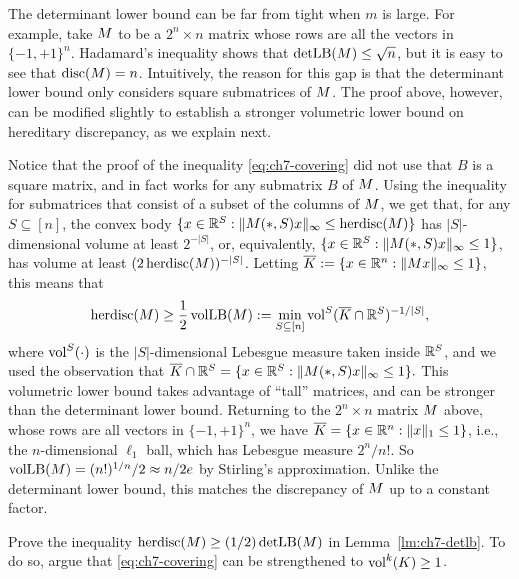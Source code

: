 \begin{remark}\label{rem:vollb}
  The determinant lower bound can be far from tight when $m$ is
  large. For example, take $M$ to be a $2^n \times n$ matrix whose
  rows are all the vectors in $\{-1, +1\}^n$. Hadamard's inequality shows that
  $\operatorname{detLB}(M) \le \sqrt{n}$, but it is easy to see that $\operatorname{disc}(M)
  = n$. Intuitively, the reason for this gap is that the determinant
  lower bound only considers square submatrices of $M$. The proof
  above, however, can be modified slightly to establish a
  stronger volumetric lower bound on hereditary discrepancy, as we
  explain next. 

  Notice that the proof of the inequality \eqref{eq:ch7-covering} did
  not use that $B$ is a square matrix, and in fact works for any
  submatrix $B$ of $M$. Using the inequality for
  submatrices that consist of a subset of the columns of $M$, we
  get that, for any $S \subseteq [n]$, the convex body
  $\{x \in \mathbb{R}^S: \|M(*,S) x\|_{\infty} \le \operatorname{herdisc}(M)\}$ has
  $|S|$-dimensional volume at least $2^{-|S|}$, or, equivalently,
  $\{x \in \mathbb{R}^S: \|M(*,S) x\|_{\infty} \le 1\}$, has volume at
  least $(2\operatorname{herdisc}(M))^{-|S|}$. Letting 
  $\overline{K} := \{x \in \mathbb{R}^n: \|M x\|_{\infty} \le 1\}$,
  this means that
  \begin{equation}
    \label{eq:vollb}
    \operatorname{herdisc}(M) \ge \frac12 \operatorname{volLB}(M) :=
    \min_{S \subseteq [n]}\operatorname{vol}^{S}(\overline{K} \cap \mathbb{R}^S)^{-1/|S|},
  \end{equation}
  where $\operatorname{vol}^S(\cdot)$ is the $|S|$-dimensional Lebesgue measure
  taken inside $\mathbb{R}^S$, and we used the observation that
  \(
  \overline{K} \cap \mathbb{R}^S = \{x \in \mathbb{R}^S: \|M(*,S) x\|_{\infty} \le 1\}.
  \)
   This volumetric lower bound takes advantage of
  ``tall'' matrices, and can be stronger than the determinant lower
  bound. Returning to the $2^n \times n$ matrix $M$ above, whose rows are
  all vectors in $\{-1,+1\}^n$, we have
  $\overline{K} = \{x \in \mathbb{R}^n: \|x\|_1 \le 1\}$, i.e., the
  $n$-dimensional $\ell_1$ ball, which has Lebesgue measure
  $2^n/n!$. So $\operatorname{volLB}(M) = (n!)^{1/n}/2 \approx n/2e$ by
  Stirling's approximation. Unlike the determinant lower bound, this
  matches the discrepancy of $M$  up to a constant factor.
\end{remark}

\begin{exercise}
  Prove the inequality \(\operatorname{herdisc}(M) \ge (1/2) \operatorname{detLB}(M)\) in
  Lemma~\ref{lm:ch7-detlb}. To do so, argue that
  \eqref{eq:ch7-covering} can be strengthened to $\operatorname{vol}^k(K) \ge 1$.
\end{exercise}


